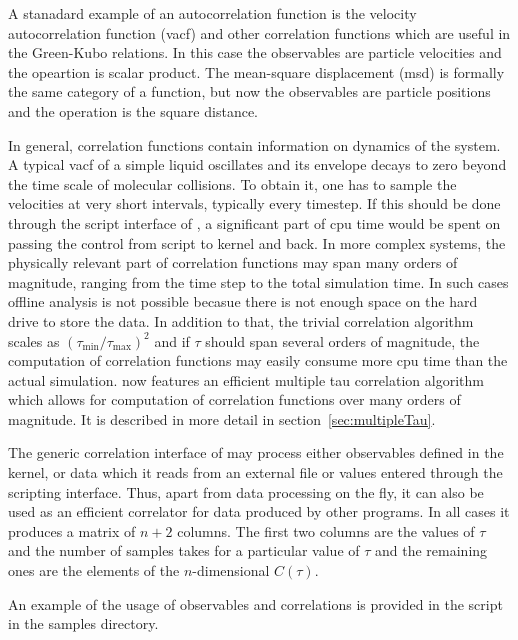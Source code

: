 A stanadard example of an autocorrelation function is the velocity
autocorrelation function (vacf) and other correlation functions
which are useful in the Green-Kubo relations. In this case the observables
are particle velocities and the opeartion is scalar product.
The mean-square displacement (msd) is formally the same category of
a function, but now the observables are particle positions and
the operation is the square distance. 

In general, correlation functions
contain information on dynamics of the system. A typical vacf of a 
simple liquid oscillates and its envelope decays to zero beyond the 
time scale of molecular collisions.
To obtain it, one has to sample the velocities at very short intervals,
typically every timestep. If this should be done through the script interface
of \es, a significant part of cpu time would be spent on passing the control
from script to kernel and back. In more complex systems, the physically relevant 
part of correlation functions may span many orders of magnitude, ranging
from the time step to the total simulation time. In such cases offline
analysis is not possible becasue there is not enough space on the hard
drive to store the data. In addition to that, the trivial correlation algorithm
scales as $(\tau_{\mathrm{min}}/\tau_{\mathrm{max}})^2$ and if $\tau$
should span several orders of magnitude, the computation of correlation
functions may easily consume more cpu time than the actual simulation.
\es now features an efficient multiple tau correlation algorithm which
allows for computation of correlation functions over many orders of magnitude.
It is described in more detail in section~\ref{sec:multipleTau}.

The generic correlation interface of \es may process either observables
defined in the kernel, or data which it reads from an external file
or values entered through the scripting interface. 
Thus, apart from
data processing on the fly, it can also be used as an efficient correlator
for data produced by other programs. In all cases it produces a matrix of 
$n+2$ columns. The first two columns are the values of $\tau$ and 
the number of samples takes for a particular value of $\tau$ and the
remaining ones are the elements of the $n$-dimensional $C(\tau)$.


An example of the usage of observables and correlations is provided 
in the script  in the samples directory.

